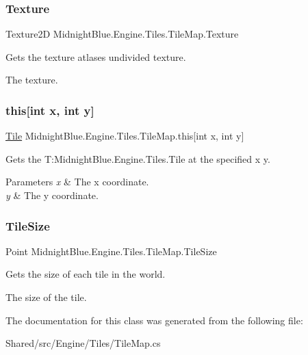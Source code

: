 \subsubsection{\texorpdfstring{Texture}{Texture}}
{\footnotesize\ttfamily Texture2D Midnight\+Blue.\+Engine.\+Tiles.\+Tile\+Map.\+Texture\hspace{0.3cm}{\ttfamily [get]}}



Gets the texture atlases undivided texture. 

The texture.\hypertarget{class_midnight_blue_1_1_engine_1_1_tiles_1_1_tile_map_aaa31f70007fee9ded9c727d2eceda1b5}{}\label{class_midnight_blue_1_1_engine_1_1_tiles_1_1_tile_map_aaa31f70007fee9ded9c727d2eceda1b5} 
\subsubsection{\texorpdfstring{this[int x, int y]}{this[int x, int y]}}
{\footnotesize\ttfamily \hyperlink{class_midnight_blue_1_1_tile}{Tile} Midnight\+Blue.\+Engine.\+Tiles.\+Tile\+Map.\+this\mbox{[}int x, int y\mbox{]}\hspace{0.3cm}{\ttfamily [get]}}



Gets the T\+:\+Midnight\+Blue.\+Engine.\+Tiles.\+Tile at the specified x y. 


\begin{DoxyParams}{Parameters}
{\em x} & The x coordinate.\\
\hline
{\em y} & The y coordinate.\\
\hline
\end{DoxyParams}
\hypertarget{class_midnight_blue_1_1_engine_1_1_tiles_1_1_tile_map_a5401474616db996c4755c634cdd056eb}{}\label{class_midnight_blue_1_1_engine_1_1_tiles_1_1_tile_map_a5401474616db996c4755c634cdd056eb} 
\subsubsection{\texorpdfstring{Tile\+Size}{TileSize}}
{\footnotesize\ttfamily Point Midnight\+Blue.\+Engine.\+Tiles.\+Tile\+Map.\+Tile\+Size\hspace{0.3cm}{\ttfamily [get]}}



Gets the size of each tile in the world. 

The size of the tile.

The documentation for this class was generated from the following file\+:\begin{DoxyCompactItemize}
\item 
Shared/src/\+Engine/\+Tiles/Tile\+Map.\+cs\end{DoxyCompactItemize}
